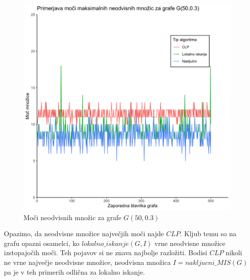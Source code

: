 \documentclass[a4paper, 12pt]{article}
\begin{document}
\begin{figure}[h!]
	\begin{center}
		\includegraphics[scale=0.12]{R_koda/pon-moc.png}
		\caption{Moči neodvisnih množic za grafe $G(50,0.3)$}
	\end{center}
\end{figure}
Opazimo, da neodvisne množice največjih moči najde $CLP$. Kljub temu so na grafu opazni osamelci, ko $lokalno\_iskanje(G, I)$ vrne neodvisne množice izstopajočih moči. Teh pojavov si ne znava najbolje razložiti. Bodisi $CLP$ nikoli
ne vrne največje neodvisne množice, neodvisna množica $I = nakljucni\_MIS(G)$ pa je v teh primerih odlična za lokalno iskanje.
\end{document}

